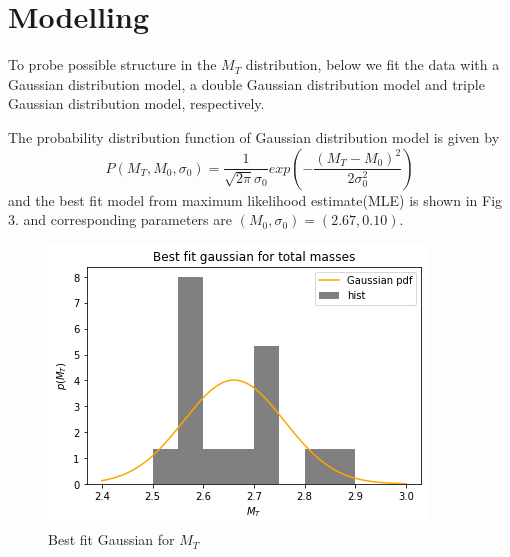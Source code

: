 \documentclass[journal,12pt,twocolumn]{IEEEtran}
\begin{document}
\section{Modelling}
To probe possible structure in the $M_T$ distribution, below we fit the data with a Gaussian distribution model, a double Gaussian distribution model and triple Gaussian distribution model, respectively. 

The probability distribution function of Gaussian distribution model is given by
\begin{equation}
P\left(M_{T}, M_{0}, \sigma_{0}\right) = \frac{1}{\sqrt{2\pi}\sigma_{0}}exp\left(-\frac{(M_T-M_0)^2}{2\sigma_{0}^2}\right)
\end{equation}
and the best fit model from maximum likelihood estimate(MLE) is shown in Fig 3. and corresponding parameters are $(M_0, \sigma_0)=(2.67, 0.10).$
\begin{figure}[ht!]
\centering
\includegraphics[scale=0.6]{fig/gau.png}
\caption{Best fit Gaussian for $M_T$}
\end{figure}
\end{document}
